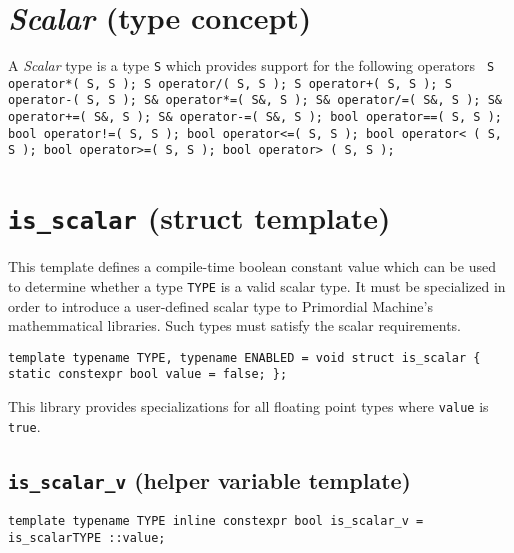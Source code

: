 \documentclass[oneside]{book}
\begin{document}
\section{\textit{Scalar} (type concept)}
A \textit{Scalar} type is a type \texttt{S} which provides support for the following operators\newline
\texttt{
S operator*( S, S );\newline
S operator/( S, S );\newline
S operator+( S, S );\newline
S operator-( S, S );\newline
\newline
S\& operator*=( S\&, S );\newline
S\& operator/=( S\&, S );\newline
S\& operator+=( S\&, S );\newline
S\& operator-=( S\&, S );\newline
\newline
bool operator==( S, S );\newline
bool operator!=( S, S );\newline
bool operator<=( S, S );\newline
bool operator< ( S, S );\newline
bool operator>=( S, S );\newline
bool operator> ( S, S );}

\section{\texttt{is\_scalar} (struct template)}
This template defines a compile-time boolean constant value which can be used to
determine whether a type \texttt{TYPE} is a valid scalar type. It must        be
specialized in order to introduce a user-defined scalar type to       Primordial
Machine's mathemmatical libraries. Such types must satisfy the            scalar
requirements.\newline

\texttt{template \textlangle typename TYPE, typename ENABLED = void\textrangle\newline
struct is\_scalar \{\newline
\hspace*{2em}static constexpr bool value = false;\newline
\};}\newline

This library provides specializations for all floating point types
where \texttt{value} is \texttt{true}.

\subsection{\texttt{is\_scalar\_v} (helper variable template)}
\texttt{template \textlangle typename TYPE\textrangle\newline
inline constexpr bool is\_scalar\_v = is\_scalar\textlangle TYPE \textrangle::value;}



\end{document}
